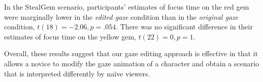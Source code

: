 In the StealGem scenario, participants' estimates of focus time on the red gem were marginally lower in the \emph{edited gaze} condition than in the \emph{original gaze} condition, $t(18) = -2.06, p = .054$. There was no significant difference in their estimates of focus time on the yellow gem, $t(22) = 0, p = 1$.

Overall, these results suggest that our gaze editing approach is effective in that it allows a novice to modify the gaze animation of a character and obtain a scenario that is interpreted differently by na{\"i}ve viewers.
